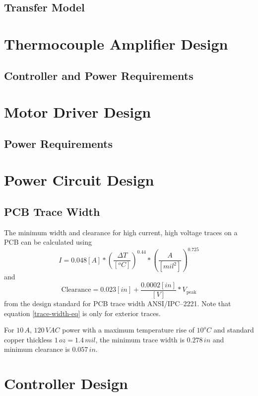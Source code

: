 \documentclass[10pt, twocolumn]{article}
\begin{document}
\subsection{Transfer Model}

\section{Thermocouple Amplifier Design}

\subsection{Controller and Power Requirements}

\section{Motor Driver Design}

\subsection{Power Requirements}

\section{Power Circuit Design}

\subsection{PCB Trace Width}

The minimum width and clearance for high current, high voltage traces
on a PCB can be calculated using
\begin{equation}
I=0.048[A]*\left(\frac{\Delta T}{[^{o}C]}\right)^{0.44}*\left(\frac{A}{[mil^{2}]}\right)^{0.725}
\label{trace-width-eq}
\end{equation}
and
\begin{equation}
\textrm{Clearance}=0.023[in]+\frac{0.0002[in]}{[V]}*V_{\textrm{peak}}
\end{equation}
from the design standard for PCB trace width ANSI/IPC--2221. Note that
equation \ref{trace-width-eq} is only for exterior traces.

For $10\,A$, $120\,VAC$ power with a maximum temperature rise of $10^{o}C$
and standard copper thickless $1\,oz=1.4\,mil$, the minimum trace width
is $0.278\,in$ and minimum clearance is $0.057\,in$.

\section{Controller Design}
\end{document}
